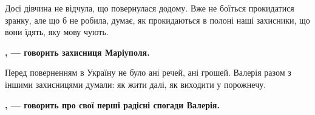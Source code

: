 Досі дівчина не відчула, що повернулася додому. Вже не боїться прокидатися
зранку, але що б не робила, думає, як прокидаються в полоні наші захисники, що
вони їдять, яку мову чують.

\begin{leftbar}
	\begingroup
		\bfseries
{}, — говорить захисниця Маріуполя.
	\endgroup
\end{leftbar}

Перед поверненням в Україну не було ані речей, ані грошей. Валерія разом з
іншими захисницями думали: як жити далі, як виходити у порожнечу.

\begin{leftbar}
	\begingroup
		\bfseries
{}, — говорить про свої перші радісні
спогади Валерія.
	\endgroup
\end{leftbar}
